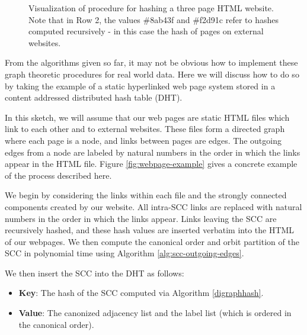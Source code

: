 \documentclass{svproc}
\begin{document}
\begin{figure}

\caption{Visualization of procedure for hashing a three page HTML website. Note that in Row 2, the values \#8ab43f and \#f2d91c refer to hashes computed recursively - in this case the hash of pages on external websites.}

\end{figure}

From the algorithms given so far, it may not be obvious how to implement these graph theoretic procedures for real world data. Here we will discuss how to do so by taking the example of a static hyperlinked web page system stored in a content addressed distributed hash table (DHT).

In this sketch, we will assume that our web pages are static HTML files which link to each other and to external websites. These files form a directed graph where each page is a node, and links between pages are edges. The outgoing edges from a node are labeled by natural numbers in the order in which the links appear in the HTML file. Figure \ref{fig:webpage-example} gives a concrete example of the process described here.

We begin by considering the links within each file and the strongly connected components created by our website. All intra-SCC links are replaced with natural numbers in the order in which the links appear. Links leaving the SCC are recursively hashed, and these hash values are inserted verbatim into the HTML of our webpages. We then compute the canonical order and orbit partition of the SCC in polynomial time using Algorithm \ref{alg:scc-outgoing-edges}.

We then insert the SCC into the DHT as follows:
\begin{itemize}
  \item \textbf{Key}: The hash of the SCC computed via Algorithm \ref{digraphhash}.
  \item \textbf{Value}: The canonized adjacency list and the label list (which is ordered in the canonical order).
\end{itemize}
\end{document}
